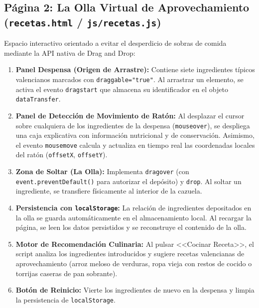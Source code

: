 \documentclass[11pt,a4paper]{article}
\begin{document}
\subsection{Página 2: La Olla Virtual de Aprovechamiento (\texttt{recetas.html} / \texttt{js/recetas.js})}
Espacio interactivo orientado a evitar el desperdicio de sobras de comida mediante la API nativa de Drag and Drop:
\begin{enumerate}
    \item \textbf{Panel Despensa (Origen de Arrastre):} Contiene siete ingredientes típicos valencianos marcados con \texttt{draggable="true"}. Al arrastrar un elemento, se activa el evento \texttt{dragstart} que almacena su identificador en el objeto \texttt{dataTransfer}.
    \item \textbf{Panel de Detección de Movimiento de Ratón:} Al desplazar el cursor sobre cualquiera de los ingredientes de la despensa (\texttt{mouseover}), se despliega una caja explicativa con información nutricional y de conservación. Asimismo, el evento \texttt{mousemove} calcula y actualiza en tiempo real las coordenadas locales del ratón (\texttt{offsetX}, \texttt{offsetY}).
    \item \textbf{Zona de Soltar (La Olla):} Implementa \texttt{dragover} (con \texttt{event.preventDefault()} para autorizar el depósito) y \texttt{drop}. Al soltar un ingrediente, se transfiere físicamente al interior de la cazuela.
    \item \textbf{Persistencia con \texttt{localStorage}:} La relación de ingredientes depositados en la olla se guarda automáticamente en el almacenamiento local. Al recargar la página, se leen los datos persistidos y se reconstruye el contenido de la olla.
    \item \textbf{Motor de Recomendación Culinaria:} Al pulsar <<Cocinar Receta>>, el script analiza los ingredientes introducidos y sugiere recetas valencianas de aprovechamiento (arroz meloso de verduras, ropa vieja con restos de cocido o torrijas caseras de pan sobrante).
    \item \textbf{Botón de Reinicio:} Vierte los ingredientes de nuevo en la despensa y limpia la persistencia de \texttt{localStorage}.
\end{enumerate}
\end{document}
